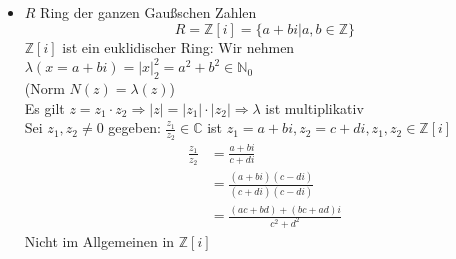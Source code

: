 \documentclass{article}
\newcommand{\N}{\mathbb{N}}
\newcommand{\Z}{\mathbb{Z}}
\newcommand{\C}{\mathbb{C}}
\begin{document}
\begin{itemize}
\begin{itemize}
                Sei $h(x):=x^{n-l}\cdot\frac{a_n}{b_l}g(x)$
                Dann ist $\lambda(h)=n-l+l=n$\\
                Induktion auf $f-h$ anwenden
                ($\deg(f-h)<n$)
                \begin{align*}
                    f(x)-h(x)&=q(x)g(x)+r(x)\\
                    f(x)&=h(x)+q(x)g(x)+r(x)\\
                    &=
                    \underbrace{\left(\frac{a_n}{b_l}x^{n-l}
                    +q(x)\right)}_{\text{Neues } q(x)}
                    g(x)r(x)
                \end{align*}
                mit $\deg r(x)<\lambda(g(x))$ oder $r(x)=0$
        \end{itemize}
    \item
        $R$ Ring der ganzen Gaußschen Zahlen
        \begin{equation*}
            R=\Z[i]=\{a+bi|a,b\in\Z\}
        \end{equation*}
        $\Z[i]$ ist ein euklidischer Ring: Wir nehmen
        $\lambda(x=a+bi)=|x|_2^2=a^2+b^2 \in\N_0$\\
        \color{blue}
        (Norm $N(z)=\lambda(z)$)\\
        \color{purple}
        Es gilt $z=z_1\cdot z_2\Rightarrow
        |z|=|z_1|\cdot |z_2|\Rightarrow \lambda$
        ist multiplikativ\\
        Sei $z_1,z_2\neq 0$ gegeben: $\frac{z_1}{z_2}\in\C$
        ist $z_1=a+bi,z_2=c+di,z_1,z_2\in\Z[i]$
        \begin{align*}
            \frac{z_1}{z_2}
            &=\frac{a+bi}{c+di}\\
            &=\frac{(a+bi)(c-di)}{(c+di)(c-di)}\\
            &=\frac{(ac+bd)+(bc+ad)i}{c^2+d^2}
        \end{align*}
        Nicht im Allgemeinen in $\Z[i]$\\
\end{itemize}
\end{document}

